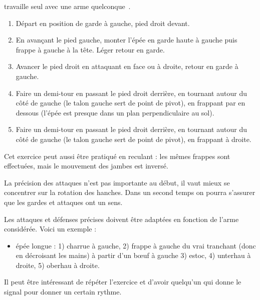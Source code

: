 \begin{exercice}


\A travaille seul avec une arme quelconque~\footnotemark{}.

\begin{enumerate}
	\item Départ en position de garde à gauche, pied droit devant.
	
	\item En avançant le pied gauche, monter l'épée en garde haute à gauche puis frappe à gauche à la tête.
	Léger retour en garde.
	
	\item Avancer le pied droit en attaquant en face ou à droite, retour en garde à gauche.
	
	\item Faire un demi-tour en passant le pied droit derrière, en tournant autour du côté de gauche (le talon gauche sert de point de pivot), en frappant par en dessous (l'épée est presque dans un plan perpendiculaire au sol).
	
	\item Faire un demi-tour en passant le pied droit derrière, en tournant autour du côté de gauche (le talon gauche sert de point de pivot), en frappant à droite.
\end{enumerate}
Cet exercice peut aussi être pratiqué en reculant : les mêmes frappes sont effectuées, mais le mouvement des jambes est inversé.

La précision des attaques n'est pas importante au début, il vaut mieux se concentrer sur la rotation des hanches.
Dans un second temps on pourra s'assurer que les gardes et attaques ont un sens.

Les attaques et défenses précises doivent être adaptées en fonction de l'arme considérée.
Voici un exemple :
\begin{itemize}
	\item épée longue : 1) charrue à gauche, 2) frappe à gauche du vrai tranchant (donc en décroisant les mains) à partir d'un bœuf à gauche 3) estoc, 4) unterhau à droite, 5) oberhau à droite.
\end{itemize}

Il peut être intéressant de répéter l'exercice et d'avoir quelqu'un qui donne le signal pour donner un certain rythme.

\end{exercice}




